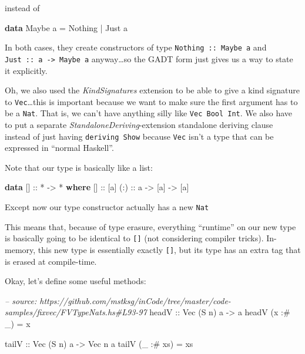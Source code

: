 \documentclass[]{article}
\newenvironment{Shaded}{}{}
\newcommand{\KeywordTok}[1]{\textcolor[rgb]{0.00,0.44,0.13}{\textbf{{#1}}}}
\newcommand{\DataTypeTok}[1]{\textcolor[rgb]{0.56,0.13,0.00}{{#1}}}
\newcommand{\CommentTok}[1]{\textcolor[rgb]{0.38,0.63,0.69}{\textit{{#1}}}}
\newcommand{\OtherTok}[1]{\textcolor[rgb]{0.00,0.44,0.13}{{#1}}}
\newcommand{\FunctionTok}[1]{\textcolor[rgb]{0.02,0.16,0.49}{{#1}}}
\newcommand{\NormalTok}[1]{{#1}}
\begin{document}
instead of

\begin{Shaded}
\begin{Highlighting}[]
\KeywordTok{data} \DataTypeTok{Maybe} \NormalTok{a }\FunctionTok{=} \DataTypeTok{Nothing} \FunctionTok{|} \DataTypeTok{Just} \NormalTok{a}
\end{Highlighting}
\end{Shaded}

In both cases, they create constructors of type \texttt{Nothing\ ::\ Maybe\ a}
and \texttt{Just\ ::\ a\ -\textgreater{}\ Maybe\ a} anyway\ldots{}so the GADT
form just gives us a way to state it explicitly.

Oh, we also used the \emph{KindSignatures} extension to be able to give a kind
signature to \texttt{Vec}\ldots{}this is important because we want to make sure
the first argument has to be a \texttt{Nat}. That is, we can't have anything
silly like \texttt{Vec\ Bool\ Int}. We also have to put a separate
\emph{StandaloneDeriving}-extension standalone deriving clause instead of just
having \texttt{deriving\ Show} because \texttt{Vec} isn't a type that can be
expressed in ``normal Haskell''.

Note that our type is basically like a list:

\begin{Shaded}
\begin{Highlighting}[]
\KeywordTok{data} \NormalTok{[]}\OtherTok{ ::} \FunctionTok{*} \OtherTok{->} \FunctionTok{*} \KeywordTok{where}
    \NormalTok{[]}\OtherTok{  ::} \NormalTok{[a]}
\OtherTok{    (:) ::} \NormalTok{a }\OtherTok{->} \NormalTok{[a] }\OtherTok{->} \NormalTok{[a]}
\end{Highlighting}
\end{Shaded}

Except now our type constructor actually has a new \texttt{Nat}

This means that, because of type erasure, everything ``runtime'' on our new type
is basically going to be identical to \texttt{{[}{]}} (not considering compiler
tricks). In-memory, this new type is essentially exactly \texttt{{[}{]}}, but
its type has an extra tag that is erased at compile-time.

Okay, let's define some useful methods:

\begin{Shaded}
\begin{Highlighting}[]
\CommentTok{-- source: https://github.com/mstksg/inCode/tree/master/code-samples/fixvec/FVTypeNats.hs#L93-97}
\OtherTok{headV ::} \DataTypeTok{Vec} \NormalTok{(}\DataTypeTok{S} \NormalTok{n) a }\OtherTok{->} \NormalTok{a}
\NormalTok{headV (x }\FunctionTok{:#} \NormalTok{_)  }\FunctionTok{=} \NormalTok{x}

\OtherTok{tailV ::} \DataTypeTok{Vec} \NormalTok{(}\DataTypeTok{S} \NormalTok{n) a }\OtherTok{->} \DataTypeTok{Vec} \NormalTok{n a}
\NormalTok{tailV (_ }\FunctionTok{:#} \NormalTok{xs) }\FunctionTok{=} \NormalTok{xs}
\end{Highlighting}
\end{Shaded}
\end{document}
